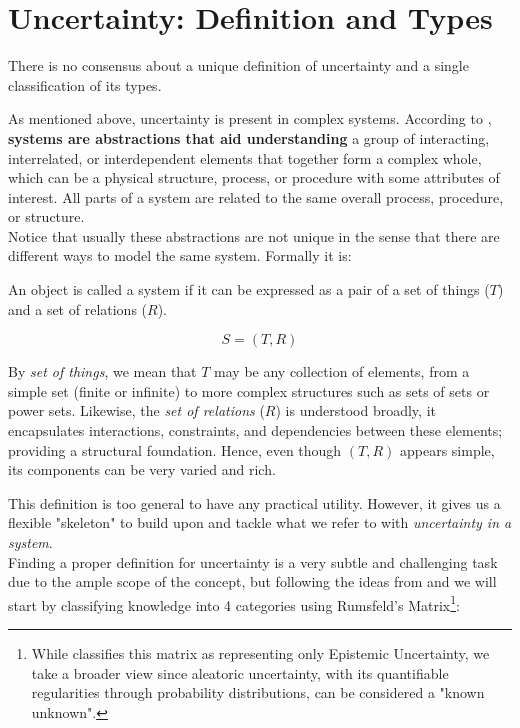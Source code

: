 \section{Uncertainty: Definition and Types}

There is no consensus about a unique definition of uncertainty and a single classification of its types. 

As mentioned above, uncertainty is present in complex systems. According to \cite{UncertaintySciences}, \textbf{systems are abstractions that aid understanding} a group of interacting, interrelated, or interdependent elements that together form a complex whole, which can be a physical structure, process, or procedure with some attributes of interest. All parts of a system are related to the same overall process, procedure, or structure. \\

Notice that usually these abstractions are not unique in the sense that there are different ways to model the same system. Formally it is:

\begin{definition}[System]
    An object is called a system if it can be expressed as a pair of a set of things ($T$) and a set of relations ($R$).

    \[S = (T,R)\]
\end{definition}

\begin{remark}
    By \emph{set of things}, we mean that \(T\) may be any collection of elements, from a simple set (finite or infinite) to more complex structures such as sets of sets or power sets. Likewise, the \emph{set of relations} (\(R\)) is understood broadly, it encapsulates interactions, constraints, and dependencies between these elements; providing a structural foundation. Hence, even though \((T, R)\) appears simple, its components can be very varied and rich.
\end{remark}

This definition is too general to have any practical utility. However, it gives us a flexible "skeleton" to build upon and tackle what we refer to with \textit{uncertainty in a system}. \\

Finding a proper definition for uncertainty is a very subtle and challenging task due to the ample scope of the concept, but following the ideas from \cite{UncertaintySciences} and \cite{RumsfeldMatrix} we will start by classifying knowledge into 4 categories using Rumsfeld's Matrix\footnote{While \cite{RumsfeldMatrix} classifies this matrix as representing only Epistemic Uncertainty, we take a broader view since aleatoric uncertainty, with its quantifiable regularities through probability distributions, can be considered a "known unknown".}:

